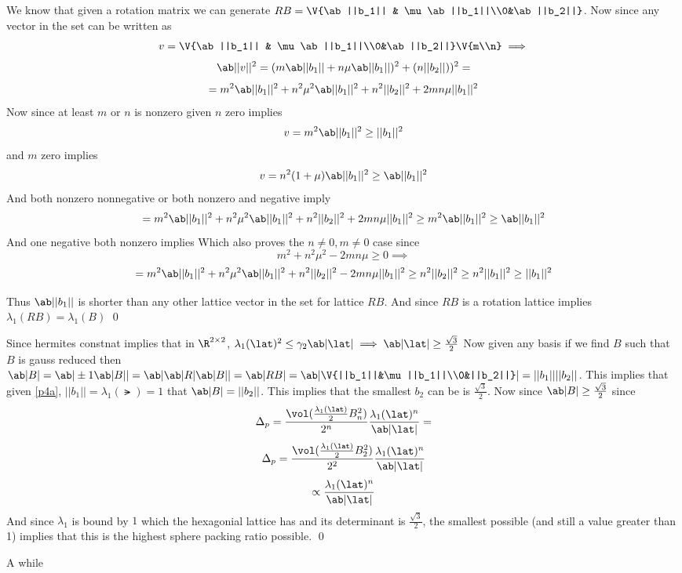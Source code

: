 \documentclass[12pt]{amsart}
\begin{document}
  \begin{problem}
    \begin{subproblem}
      We know that given a rotation matrix we can generate $RB = \V{\ab||b_1|| & \mu\ab||b_1||\\0&\ab||b_2||}$. Now since any vector in the set can be written as 
    \[v=\V{\ab||b_1|| & \mu\ab||b_1||\\0&\ab||b_2||}\V{m\\n} \implies\] 
    \[\ab||v||^2 = (m\ab||b_1||+n\mu\ab||b_1||)^2 + (n||b_2||))^2 = \] 
    \[= m^2\ab||b_1||^2 + n^2\mu^2\ab||b_1||^2 + n^2||b_2||^2 + 2mn\mu||b_1||^2\] 
    Now since at least $m$ or $n$ is nonzero given $n$ zero implies
    \[v = m^2\ab||b_1||^2 \geq ||b_1||^2\]
    and $m$ zero implies 
    \[v = n^2(1+\mu)\ab||b_1||^2 \geq \ab||b_1||^2\]
    And both nonzero nonnegative or both nonzero and negative imply 
    \[= m^2\ab||b_1||^2 + n^2\mu^2\ab||b_1||^2 + n^2||b_2||^2 + 2mn\mu||b_1||^2 \geq m^2\ab||b_1||^2 \geq \ab||b_1||^2\] 
    And one negative both nonzero implies 
    Which also proves the $n\neq0,m\neq0$ case since 
    \[m^2+n^2\mu^2 - 2mn\mu \geq 0 \implies \]
    \[= m^2\ab||b_1||^2 + n^2\mu^2\ab||b_1||^2 + n^2||b_2||^2 - 2mn\mu||b_1||^2 \geq n^2 ||b_2||^2 \geq n^2 ||b_1||^2 \geq ||b_1||^2\] 

    Thus $\ab||b_1||$ is shorter than any other lattice vector in the set for lattice $RB$. And since $RB$ is a rotation lattice implies $\lambda_1(RB)=\lambda_1(B)$ \qed
    \end{subproblem} 
    \begin{subproblem}
      Since hermites constnat implies that in $\R^{2\times2}$, $\lambda_1(\lat)^2 \leq \gamma_2 \ab|\lat| \implies \ab|\lat| \geq \frac{\sqrt{3}}2$ 
      Now given any basis if we find $B$ such that $B$ is gauss reduced then $\ab|B| = \ab|\pm1\ab|B|| = \ab|\ab|R|\ab|B|| = \ab|RB| = \ab|\V{||b_1||&\mu||b_1||\\0&||b_2||}| = ||b_1||||b_2||$.
      This implies that given \ref{p4a}, $||b_1||=\lambda_1(\lat) = 1$ that $\ab|B| = ||b_2||$. This implies that the smallest $b_2$ can be is $\frac{\sqrt{3}}2$. 
      Now since $\ab|B| \geq \frac{\sqrt{3}}2$ since 
      \[\Delta_p = \frac{\vol(\frac{\lambda_1(\lat)}2 B^2_n)}{2^n}\frac{\lambda_1(\lat)^n}{\ab|\lat|}=\]
      \[\Delta_p = \frac{\vol(\frac{\lambda_1(\lat)}2 B^2_2)}{2^2}\frac{\lambda_1(\lat)^n}{\ab|\lat|}\]
      \[\propto \frac{\lambda_1(\lat)^n}{\ab|\lat|}\]
      And since $\lambda_1$ is bound by $1$ which the hexagonial lattice has and its determinant is $\frac{\sqrt{3}}2$, the smallest possible (and still a value greater than 1) implies that this is the highest sphere packing ratio possible. \qed
    \end{subproblem}
  \end{problem}
  \begin{problem}
    A while 
  \end{problem}
\end{document}

